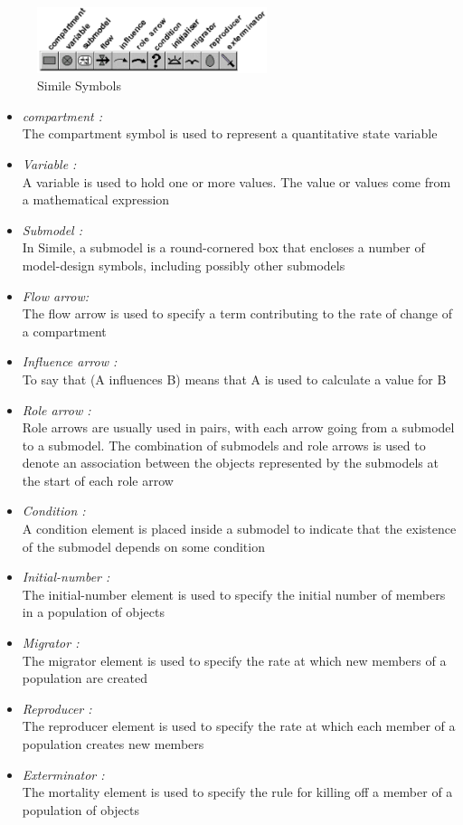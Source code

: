 \begin{figure}[htbp]
\centering
\includegraphics[width=0.6\textwidth]{pics/simile/Simile_symbols.png}
\caption{Simile Symbols}
\label{fig:Simile Symbols}	
\end{figure}

\begin{itemize}
	\item \emph{compartment :}\\
The compartment symbol is used to represent a quantitative state variable
	\item \emph{Variable :}\\
A variable is used to hold one or more values. The value or values come from a mathematical expression
	\item \emph{Submodel :}\\
In Simile, a submodel is a round-cornered box that encloses a number of model-design symbols, including possibly other submodels
	\item \emph{Flow arrow:}\\
The flow arrow is used to specify a term contributing to the rate of change of a compartment
	\item \emph{Influence arrow :}\\
To say that (A influences B) means that A is used to calculate a value for B
	\item \emph{Role arrow :}\\
Role arrows are usually used in pairs, with each arrow going from a submodel to a submodel. The combination of submodels and role arrows is used to denote an association between the objects represented by the submodels at the start of each role arrow
	\item \emph{Condition :}\\
A condition element is placed inside a submodel to indicate that the existence of the submodel depends on some condition
	\item \emph{Initial-number :}\\
The initial-number element is used to specify the initial number of members in a population of objects
	\item \emph{Migrator :}\\
The migrator element is used to specify the rate at which new members of a population are created
	\item \emph{Reproducer :}\\
The reproducer element is used to specify the rate at which each member of a population creates new members
\item \emph{Exterminator :}\\
The mortality element is used to specify the rule for killing off a member of a population of objects
\end{itemize}	

